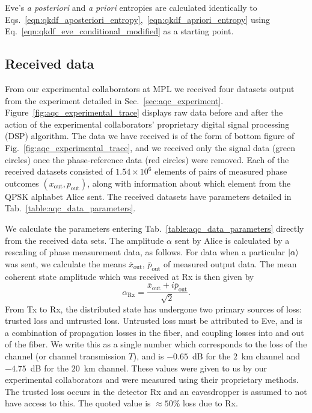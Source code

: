 Eve's \emph{a posteriori} and \emph{a priori} entropies are calculated identically to Eqs.~\ref{eqn:qkdf_aposteriori_entropy},~\ref{eqn:qkdf_apriori_entropy} using Eq.~\ref{eqn:qkdf_eve_conditional_modified} as a starting point.


\subsection{Received data}\label{sec:aqc_received_data}
From our experimental collaborators at MPL we received four datasets output from the experiment detailed in Sec.~\ref{sec:aqc_experiment}. Figure~\ref{fig:aqc_experimental_trace} displays raw data before and after the action of the experimental collaborators' proprietary digital signal processing (DSP) algorithm. The data we have received is of the form of bottom figure of Fig.~\ref{fig:aqc_experimental_trace}, and we received only the signal data (green circles) once the phase-reference data (red circles) were removed. Each of the received datasets consisted of $1.54\times10^6$ elements of pairs of measured phase outcomes $\left(x_{\text{out}}, p_{\text{out}}\right)$, along with information about which element from the QPSK alphabet Alice sent. The received datasets have parameters detailed in Tab.~\ref{table:aqc_data_parameters}.



We calculate the parameters entering Tab.~\ref{table:aqc_data_parameters} directly from the received data sets. The amplitude $\alpha$ sent by Alice is calculated by a rescaling of phase measurement data, as follows. For data when a particular $\ket{\alpha}$ was sent, we calculate the means $\bar{x}_{\text{out}}$, $\bar{p}_{\text{out}}$ of measured output data. The mean coherent state amplitude which was received at Rx is then given by 
\begin{equation}
\alpha_{\text{Rx}} = \frac{\bar{x}_{\text{out}} + i \bar{p}_{\text{out}}}{\sqrt{2}}.
\end{equation}
From Tx to Rx, the distributed state has undergone two primary sources of loss: trusted loss and untrusted loss. Untrusted loss must be attributed to Eve, and is a combination of propagation losses in the fiber, and coupling losses into and out of the fiber. We write this as a single number which corresponds to the loss of the channel (or channel transmission $T$), and is $-0.65$~dB for the $2$~km channel and $-4.75$~dB for the $20$~km channel. These values were given to us by our experimental collaborators and were measured using their proprietary methods. The trusted loss occurs in the detector Rx and an eavesdropper is assumed to not have access to this. The quoted value is $\approx 50\%$ loss due to Rx.

